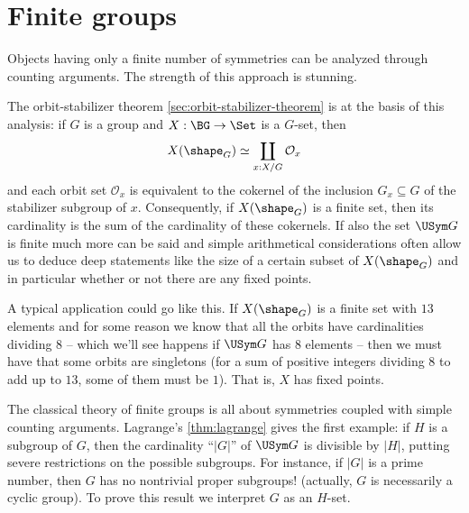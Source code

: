 \chapter{Finite groups}
\label{ch:fingp}



\label{sec:fingp}

Objects having only a finite number of symmetries can be analyzed through counting arguments.  The strength of this approach is stunning.

 The orbit-stabilizer theorem \cref{sec:orbit-stabilizer-theorem} is at the basis of this analysis: if $G$ is a group and $X:\BG\to\Set$ is a $G$-set, then
$$X(\shape_G)\simeq \coprod_{x:X/G}\mathcal O_x$$
and each orbit set $\mathcal O_x$ is equivalent to the cokernel of the inclusion $G_x\subseteq G$ of the stabilizer subgroup of $x$.
Consequently, if $X(\shape_G)$ is a finite set, then its cardinality is the sum of the cardinality of these cokernels.  If also the set $\USym G$ is finite much more can be said and simple arithmetical considerations often allow us to deduce deep statements like the size of a certain subset of $X(\shape_G)$ and in particular whether or not there are any fixed points.

\begin{example}
  A typical application could go like this.
If $X(\shape_G)$ is a finite set with $13$ elements and for some reason we know that all the orbits have cardinalities dividing $8$ -- which we'll see happens if $\USym G$ has $8$ elements -- then we must have that some orbits are singletons (for a sum of positive integers dividing $8$ to add up to $13$, some of them must be $1$).
That is, $X$ has fixed points.
\end{example}

The classical theory of finite groups is all about symmetries coupled with simple counting arguments.
Lagrange's \cref{thm:lagrange} gives the first example: if $H$ is a subgroup of $G$, then the cardinality ``$|G|$'' of $\USym G$ is divisible by $|H|$, putting severe restrictions on the possible subgroups.  For instance, if $|G|$ is a prime number, then $G$ has no nontrivial proper subgroups! (actually, $G$ is necessarily a cyclic group).  To prove this result we interpret $G$ as an $H$-set.


